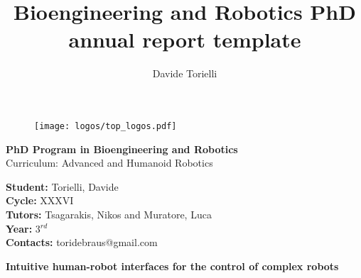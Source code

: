 \documentclass[11pt,a4paper]{article}
\author{Davide Torielli}
\title{Bioengineering and Robotics PhD annual report template}
\begin{document}
\begin{figure}[t]
	\centering
	\texttt{[image: logos/top\_logos.pdf]}
\end{figure}
\hphantom{h}\vspace{1.3cm}


\begin{center}
	
\LARGE{\textbf{PhD Program in Bioengineering and Robotics}\vspace{0.4cm}\\
Curriculum: Advanced and Humanoid Robotics}

\end{center}

\begin{flushleft}
\vspace{1.5cm}
\large{\textbf{Student: }}\large{{Torielli, Davide}}\vspace{0.2cm}\\
\large{\textbf{Cycle: }}\large{XXXVI}\vspace{0.2cm}\\
\large{\textbf{Tutors: }}\large{{Tsagarakis, Nikos and Muratore, Luca}}\vspace{0.2cm}\\
\large{\textbf{Year: }}\large{3$^{rd}$}\vspace{0.2cm}\\
\large{\textbf{Contacts: }}\large{{toridebraus@gmail.com}}
\end{flushleft}
\clearpage
\begin{center}
	\textbf{\normalsize{Intuitive human-robot interfaces for the control of complex robots}}
\end{center}









\cleardoublepage

%
%
\printbibliography[notcategory=dontbib]
\end{document}
